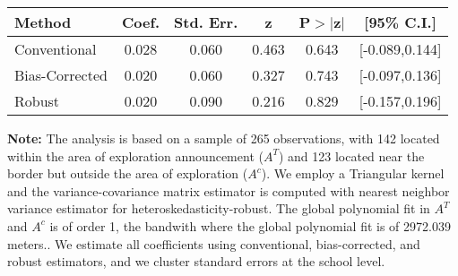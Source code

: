 \begin{table}[htbp]\centering
 \footnotesize 
\begin{tabular}{lccccc}
\hline\hline
Method & Coef. & Std. Err. & z & P$>|$z$|$ & [95\% C.I.] \\ 
\hline \hline  
Conventional & 0.028 & 0.060 & 0.463 & 0.643 & [-0.089,0.144] \\ 
 Bias-Corrected & 0.020 & 0.060 & 0.327 & 0.743 & [-0.097,0.136] \\ 
Robust & 0.020 & 0.090 & 0.216 & 0.829 & [-0.157,0.196] \\ 
  \hline\hline
\end{tabular}
\label{table:rd}
\begin{tablenotes} 
  \justifying \tiny \textbf{Note: }    
   The analysis is based on a sample of 265 observations, with 142 located within the area of exploration announcement ($A^{T}$) and 123 located near the border but outside the area of exploration  ($A^{c}$). 
           We employ a Triangular kernel and the variance-covariance matrix estimator is computed with nearest neighbor variance estimator for heteroskedasticity-robust. The global polynomial fit in  $A^{T}$ and $A^{c}$ is of order 1, the bandwith where the global polynomial fit is of 2972.039 meters.. We estimate all coefficients using conventional, bias-corrected, and robust estimators, and we cluster standard errors at the school level. \end{tablenotes} 
 \end{table} 
